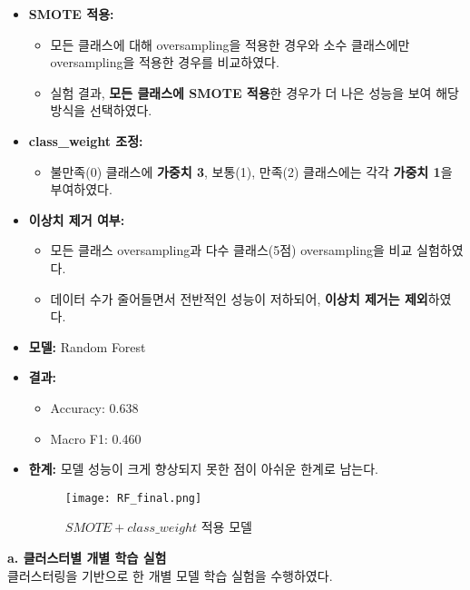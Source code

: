 \documentclass[sigconf]{acmart}
\begin{document}
\begin{CJK}{UTF8}{mj}
\begin{itemize}
  \item \textbf{SMOTE 적용:}
  \begin{itemize}
    \item 모든 클래스에 대해 oversampling을 적용한 경우와 소수 클래스에만 oversampling을 적용한 경우를 비교하였다.
    \item 실험 결과, \textbf{모든 클래스에 SMOTE 적용}한 경우가 더 나은 성능을 보여 해당 방식을 선택하였다.
  \end{itemize}
  \item \textbf{class\_weight 조정:}
  \begin{itemize}
    \item 불만족(0) 클래스에 \textbf{가중치 3}, 보통(1), 만족(2) 클래스에는 각각 \textbf{가중치 1}을 부여하였다.
  \end{itemize}
  \item \textbf{이상치 제거 여부:}
  \begin{itemize}
    \item 모든 클래스 oversampling과 다수 클래스(5점) oversampling을 비교 실험하였다.
    \item 데이터 수가 줄어들면서 전반적인 성능이 저하되어, \textbf{이상치 제거는 제외}하였다.
  \end{itemize}
  \item \textbf{모델:} Random Forest
  \item \textbf{결과:}
  \begin{itemize}
    \item Accuracy: 0.638
    \item Macro F1: 0.460
  \end{itemize}
  \item \textbf{한계:} 모델 성능이 크게 향상되지 못한 점이 아쉬운 한계로 남는다.
      \begin{figure}[H]
      \centering
      \texttt{[image: RF\_final.png]}
      \caption{$SMOTE + class\_weight$ 적용 모델}
      \label{fig:random forest adopted}
      \end{figure}
\end{itemize}

\vspace{0.5em}
\noindent\textbf{a. 클러스터별 개별 학습 실험}\mbox{}\\
클러스터링을 기반으로 한 개별 모델 학습 실험을 수행하였다.


\end{CJK}
\end{document}
